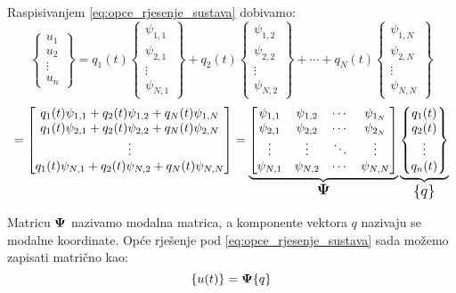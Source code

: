 Raspisivanjem \eqref{eq:opce_rjesenje_sustava} dobivamo:
\[
	\begin{Bmatrix}
		u_1\\
		u_2\\
		\vdots\\
		u_n
	\end{Bmatrix}
	=
	q_1(t)
	\begin{Bmatrix}
		\psi_{1,1}\\
		\psi_{2,1}\\
		\vdots\\
		\psi_{N,1}
	\end{Bmatrix}
	+
	q_2(t)
	\begin{Bmatrix}
		\psi_{1,2}\\
		\psi_{2,2}\\
		\vdots\\
		\psi_{N,2}
	\end{Bmatrix}
		+
		\cdots
		+
	q_N(t)
	\begin{Bmatrix}
		\psi_{1,N}\\
		\psi_{2,N}\\
		\vdots\\
		\psi_{N,N}
	\end{Bmatrix}
	\]
\[
	=
	\begin{bmatrix}
		q_1(t) \psi_{1,1} + q_2(t) \psi_{1,2} + q_N(t) \psi_{1,N} \\
		q_1(t) \psi_{2,1} + q_2(t) \psi_{2,2} + q_N(t) \psi_{2,N} \\
		\vdots \\
		q_1(t) \psi_{N,1} + q_2(t) \psi_{N,2} + q_N(t) \psi_{N,N}
	\end{bmatrix}
	=
	\underbrace{
	\begin{bmatrix}
		\psi_{1,1} & \psi_{1,2} & \cdots & \psi_{1_N} \\
		\psi_{2,1} & \psi_{2,2} & \cdots & \psi_{2_N} \\
		\vdots & \vdots & \ddots & \vdots \\
		\psi_{N,1} & \psi_{N,2} & \cdots & \psi_{N,N} 
	\end{bmatrix}
	}_{\text{\large{$\ppsi$}}}
	\underbrace{
	\begin{Bmatrix}
		q_1(t) \\
		q_2(t) \\
		\vdots \\
		q_n(t)
	\end{Bmatrix}
        }_{\text{\large{$\vtor{q}{}$}}}
\]

Matricu $\mathbf{\Psi}$ nazivamo modalna matrica, a komponente vektora $q$ nazivaju se
modalne koordinate. Opće rješenje pod \eqref{eq:opce_rjesenje_sustava} sada možemo 
zapisati matrično kao:
\begin{equation}
    \vtor{u(t)}{} = \ppsi \vtor{q}{}
\end{equation}


